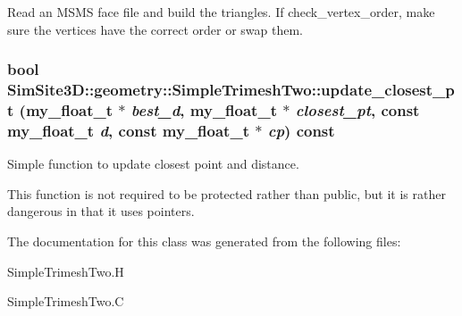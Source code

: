 Read an MSMS face file and build the triangles. If check\_\-vertex\_\-order, make sure the vertices have the correct order or swap them. 
\subsubsection{\setlength{\rightskip}{0pt plus 5cm}bool SimSite3D::geometry::Simple\-Trimesh\-Two::update\_\-closest\_\-pt (my\_\-float\_\-t $\ast$ {\em best\_\-d}, my\_\-float\_\-t $\ast$ {\em closest\_\-pt}, const my\_\-float\_\-t {\em d}, const my\_\-float\_\-t $\ast$ {\em cp}) const\hspace{0.3cm}{\tt  [inline, protected]}}\label{classSimSite3D_1_1geometry_1_1SimpleTrimeshTwo_2112115ad368fa95eda1bfd1bc585674}


Simple function to update closest point and distance. 

This function is not required to be protected rather than public, but it is rather dangerous in that it uses pointers. 

The documentation for this class was generated from the following files:\begin{CompactItemize}
\item 
Simple\-Trimesh\-Two.H\item 
Simple\-Trimesh\-Two.C\end{CompactItemize}
